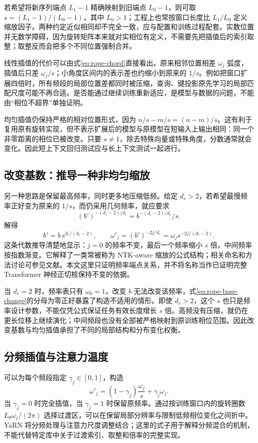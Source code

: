 \documentclass[UTF8,12pt,a4paper,fontset=fandol]{ctexart}
\begin{document}
若希望将新序列端点 $L_1-1$ 精确映射到旧端点 $L_0-1$，则可取 $s=(L_1-1)/(L_0-1)$，其中 $L_0>1$；工程上也常按窗口长度比 $L_1/L_0$ 定义缩放因子。两种约定近似相同却不完全一致，应与配置和训练过程配套。实数位置并无数学障碍，因为旋转矩阵本来就对实相位有定义，不需要先把插值后的索引取整；取整反而会把多个不同位置强制合并。

线性插值的代价可以由式\eqref{eq:rope-chord}直接看出。原来相邻位置相差 $\omega_j$ 弧度，插值后只差 $\omega_j/s$；小角度区间内的表示差也约缩小到原来的 $1/s$。例如把窗口扩展四倍时，所有频段的局部位置差都同时被压缩，查询、键投影原先学习的局部匹配尺度可能不再合适。是否能通过继续训练重新适应，是模型与数据的问题，不能由“相位不超界”单独证明。

均匀插值仍保持严格的相对位置形式，因为 $n/s-m/s=(n-m)/s$。这有利于复用原有旋转实现，但不表示扩展后的模型与原模型在短输入上输出相同：同一个非零距离的相位已被改变。只要 $s\ne1$，除去特殊向量或特殊角度，分数通常就会变化。因此短上下文回归测试应与长上下文测试一起进行。

\subsection{改变基数：推导一种非均匀缩放}
另一种思路是保留最高频率，同时更多地压缩低频。给定 $d_r>2$，若希望最慢频率正好变为原来的 $1/s$，而仍采用几何频率，就应要求
\[
(b')^{-(d_r-2)/d_r}=b^{-(d_r-2)/d_r}/s.
\]
解得
\begin{equation}
b'=b\,s^{d_r/(d_r-2)},\qquad
\omega'_j=(b')^{-2j/d_r}
=\omega_j s^{-2j/(d_r-2)}.
\label{eq:rope-base-change}
\end{equation}
这条代数推导清楚地显示：$j=0$ 的频率不变，最后一个频率缩小 $s$ 倍，中间频率按指数渐变。它解释了一类常被称为 NTK-aware 缩放的公式结构；相关命名和方法讨论可参见文献\cite{peng2023}。本文这里只证明频率端点关系，并不将名称当作已证明完整 Transformer 神经正切核保持不变的依据。

当 $d_r=2$ 时，频率表只有 $\omega_0=1$，改变 $b$ 无法改变该频率，式\eqref{eq:rope-base-change}的分母为零正好暴露了构造不适用的情形。即使 $d_r>2$，这个 $s$ 也只是频率设计参数，不能仅凭公式保证任务有效长度增长 $s$ 倍。高频没有压缩，就仍在更长位移上继续演化；中间频段也没有全部被严格映射到原训练相位范围。因此改变基数与均匀插值承担了不同的局部结构和分布变化权衡。

\subsection{分频插值与注意力温度}
可以为每个频段指定 $\gamma_j\in[0,1]$，构造
\begin{equation}
\omega'_j=(1-\gamma_j)\frac{\omega_j}{s}+\gamma_j\omega_j.
\label{eq:rope-frequency-blend}
\end{equation}
当 $\gamma_j=0$ 时完全插值，当 $\gamma_j=1$ 时保留原频率。通过按训练窗口内的旋转圈数 $L_0\omega_j/(2\pi)$ 选择过渡区，可以在保留局部分辨率与限制低频相位变化之间折中。YaRN 将分频处理与注意力尺度调整结合\cite{peng2023}；这里的式子用于解释分频混合的机制，不能代替特定库中关于过渡索引、取整和倍率的完整实现。
\end{document}
